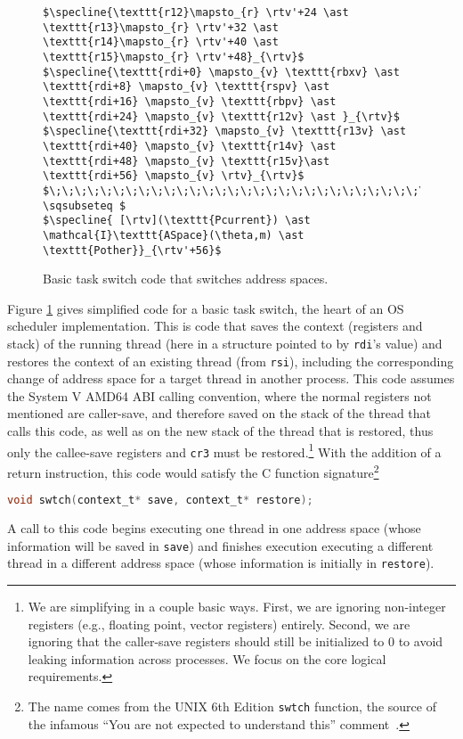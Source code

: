 \begin{figure}
\begin{lstlisting}
$\specline{\texttt{r12}\mapsto_{r} \rtv'+24 \ast \texttt{r13}\mapsto_{r} \rtv'+32 \ast \texttt{r14}\mapsto_{r} \rtv'+40 \ast \texttt{r15}\mapsto_{r} \rtv'+48}_{\rtv}$
$\specline{\texttt{rdi+0} \mapsto_{v} \texttt{rbxv} \ast \texttt{rdi+8} \mapsto_{v} \texttt{rspv} \ast \texttt{rdi+16} \mapsto_{v} \texttt{rbpv} \ast  \texttt{rdi+24} \mapsto_{v} \texttt{r12v} \ast }_{\rtv}$
$\specline{\texttt{rdi+32} \mapsto_{v} \texttt{r13v} \ast \texttt{rdi+40} \mapsto_{v} \texttt{r14v} \ast \texttt{rdi+48} \mapsto_{v} \texttt{r15v}\ast \texttt{rdi+56} \mapsto_{v} \rtv}_{\rtv}$
$\;\;\;\;\;\;\;\;\;\;\;\;\;\;\;\;\;\;\;\;\;\;\;\;\;\;\;\;\;\;\;\;\;\;\;\;\;\;\;\;\;\;\;\; \sqsubseteq $
$\specline{ [\rtv](\texttt{Pcurrent}) \ast \mathcal{I}\texttt{ASpace}(\theta,m) \ast \texttt{Pother}}_{\rtv'+56}$
\end{lstlisting}
\caption{Basic task switch code that switches address spaces.}
\label{fig:swtch}
\end{figure}

Figure \ref{fig:swtch} gives simplified code for a basic task switch, the heart of an OS scheduler implementation. This is code that saves the context (registers and stack) of the running thread (here in a structure pointed to by \lstinline|rdi|'s value) and restores the context of an existing thread (from \lstinline|rsi|), including the corresponding change of address space for a target thread in another process.
This code assumes the System V AMD64 ABI calling convention, where the normal registers not mentioned are caller-save, and therefore saved on the stack of the thread that calls this code, as well as on the new stack of the thread that is restored, thus only the callee-save registers and \texttt{cr3} must be restored.\footnote{We are simplifying in a couple basic ways. First, we are ignoring non-integer registers (e.g., floating point, vector registers) entirely. Second, we are ignoring that the caller-save registers should still be initialized to 0 to avoid leaking information across processes. We focus on the core logical requirements.}
With the addition of a return instruction, this code would satisfy the C function signature\footnote{The name comes from the UNIX 6th Edition \lstinline|swtch| function, the source of the infamous ``You are not expected to understand this'' comment~\cite{lions1996lions}.}
\begin{lstlisting}[language=C]
void swtch(context_t* save, context_t* restore);
\end{lstlisting}
A call to this code begins executing one thread in one address space (whose information will be saved in \lstinline[language=C]|save|) and finishes execution executing a different thread in a different address space (whose information is initially in \lstinline[language=C]|restore|).

